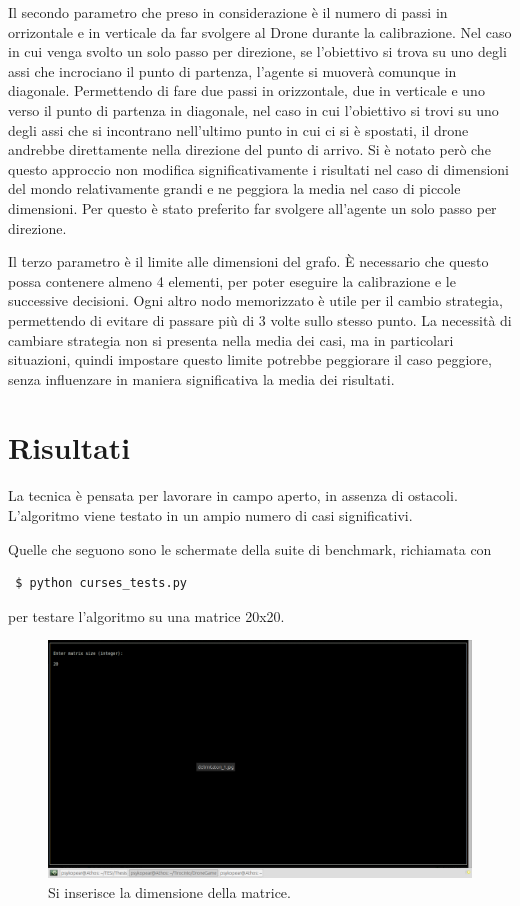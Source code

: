 Il secondo parametro che preso in considerazione è il numero di passi in orrizontale e in verticale da far svolgere al Drone durante la calibrazione. Nel caso in cui venga svolto un solo passo per direzione, se l'obiettivo si trova su uno degli assi che incrociano il punto di partenza, l'agente si muoverà comunque in diagonale. Permettendo di fare due passi in orizzontale, due in verticale e uno verso il punto di partenza in diagonale, nel caso in cui l'obiettivo si trovi su uno degli assi che si incontrano nell'ultimo punto in cui ci si è spostati, il drone andrebbe direttamente nella direzione del punto di arrivo. Si è notato però che questo approccio non modifica significativamente i risultati nel caso di dimensioni del mondo relativamente grandi e ne peggiora la media nel caso di piccole dimensioni. Per questo è stato preferito far svolgere all'agente un solo passo per direzione.

Il terzo parametro è il limite alle dimensioni del grafo. È necessario che questo possa contenere almeno 4 elementi, per poter eseguire la calibrazione e le successive decisioni. Ogni altro nodo memorizzato è utile per il cambio strategia, permettendo di evitare di passare più di 3 volte sullo stesso punto. La necessità di cambiare strategia non si presenta nella media dei casi, ma in particolari situazioni, quindi impostare questo limite potrebbe peggiorare il caso peggiore, senza influenzare in maniera significativa la media dei risultati.
	
\section{Risultati}
La tecnica è pensata per lavorare in campo aperto, in assenza di ostacoli. L'algoritmo viene testato in un ampio numero di casi significativi.

Quelle che seguono sono le schermate della suite di benchmark, richiamata con 

\begin{verbatim} $ python curses_tests.py \end{verbatim}

per testare l'algoritmo su una matrice 20x20.

\begin{figure}[hb]
\center
\includegraphics[width=\textwidth]{immagini/Test1-1.png}
\caption{Si inserisce la dimensione della matrice.}
\end{figure}

